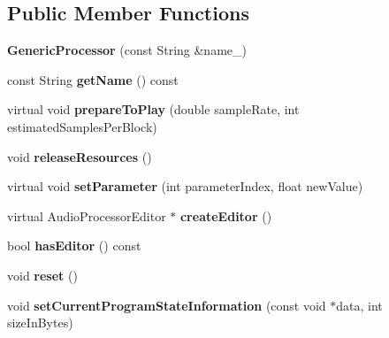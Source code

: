 \subsection*{Public Member Functions}
\begin{DoxyCompactItemize}
\item 
\hypertarget{classGenericProcessor_a907fc14eecca11021d9e129d0aee9700}{{\bfseries Generic\-Processor} (const String \&name\-\_\-)}\label{classGenericProcessor_a907fc14eecca11021d9e129d0aee9700}

\item 
\hypertarget{classGenericProcessor_aad3c1acb9fdeda122892ab9c5276119f}{const String {\bfseries get\-Name} () const }\label{classGenericProcessor_aad3c1acb9fdeda122892ab9c5276119f}

\item 
\hypertarget{classGenericProcessor_a38456d9796c0fcf521c173cf4338c728}{virtual void {\bfseries prepare\-To\-Play} (double sample\-Rate, int estimated\-Samples\-Per\-Block)}\label{classGenericProcessor_a38456d9796c0fcf521c173cf4338c728}

\item 
\hypertarget{classGenericProcessor_a53daa94f674d6b7e5e3d55fda717ec96}{void {\bfseries release\-Resources} ()}\label{classGenericProcessor_a53daa94f674d6b7e5e3d55fda717ec96}

\item 
\hypertarget{classGenericProcessor_ad8c8e91c2204a1d48d2d3b3bf117c09d}{virtual void {\bfseries set\-Parameter} (int parameter\-Index, float new\-Value)}\label{classGenericProcessor_ad8c8e91c2204a1d48d2d3b3bf117c09d}

\item 
\hypertarget{classGenericProcessor_a4336e8c17d1ba015933628d6902896fa}{virtual Audio\-Processor\-Editor $\ast$ {\bfseries create\-Editor} ()}\label{classGenericProcessor_a4336e8c17d1ba015933628d6902896fa}

\item 
\hypertarget{classGenericProcessor_a225a527d11f4ba694bc9557cf57ce656}{bool {\bfseries has\-Editor} () const }\label{classGenericProcessor_a225a527d11f4ba694bc9557cf57ce656}

\item 
\hypertarget{classGenericProcessor_ac5d607b4b7202294d26bbdbe61abd9a8}{void {\bfseries reset} ()}\label{classGenericProcessor_ac5d607b4b7202294d26bbdbe61abd9a8}

\item 
\hypertarget{classGenericProcessor_aab9014ebf17e362217a92f8f5b911e9d}{void {\bfseries set\-Current\-Program\-State\-Information} (const void $\ast$data, int size\-In\-Bytes)}\label{classGenericProcessor_aab9014ebf17e362217a92f8f5b911e9d}


\end{DoxyCompactItemize}
